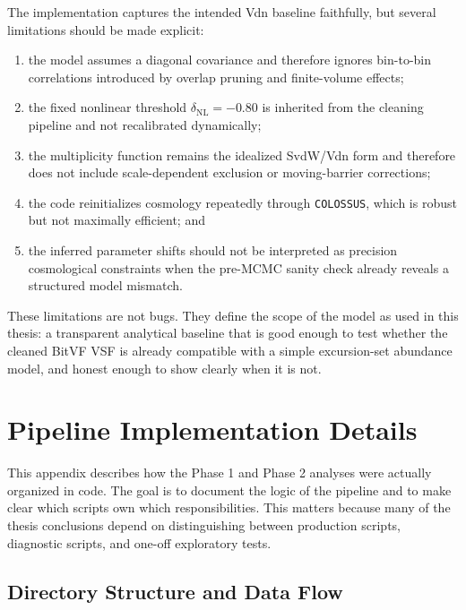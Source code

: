 \documentclass[12pt]{report}
\begin{document}
The implementation captures the intended Vdn baseline faithfully, but several limitations should be made explicit:
\begin{enumerate}
    \item the model assumes a diagonal covariance and therefore ignores bin-to-bin correlations introduced by overlap pruning and finite-volume effects;
    \item the fixed nonlinear threshold $\delta_\mathrm{NL}=-0.80$ is inherited from the cleaning pipeline and not recalibrated dynamically;
    \item the multiplicity function remains the idealized SvdW/Vdn form and therefore does not include scale-dependent exclusion or moving-barrier corrections;
    \item the code reinitializes cosmology repeatedly through \texttt{COLOSSUS}, which is robust but not maximally efficient; and
    \item the inferred parameter shifts should not be interpreted as precision cosmological constraints when the pre-MCMC sanity check already reveals a structured model mismatch.
\end{enumerate}

These limitations are not bugs. They define the scope of the model as used in this thesis: a transparent analytical baseline that is good enough to test whether the cleaned BitVF VSF is already compatible with a simple excursion-set abundance model, and honest enough to show clearly when it is not.


\chapter{Pipeline Implementation Details}
\label{app:pipeline}

This appendix describes how the Phase 1 and Phase 2 analyses were actually organized in code. The goal is to document the logic of the pipeline and to make clear which scripts own which responsibilities. This matters because many of the thesis conclusions depend on distinguishing between production scripts, diagnostic scripts, and one-off exploratory tests.

\section{Directory Structure and Data Flow}
\end{document}
